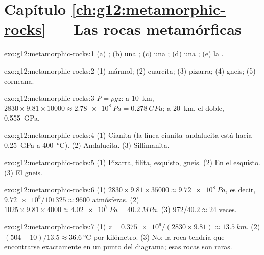 \section*{Capítulo \ref{ch:g12:metamorphic-rocks} --- Las rocas metamórficas}

\begin{solution}{exo:g12:metamorphic-rocks:1}
(a) ; (b) una ; (c) una ; (d) una ;
(e) la .
\end{solution}

\begin{solution}{exo:g12:metamorphic-rocks:2}
(1) mármol; (2) cuarcita; (3) pizarra; (4) gneis; (5) corneana.
\end{solution}

\begin{solution}{exo:g12:metamorphic-rocks:3}
$P = \rho g z$: a \qty{10}{km}, $2830 \times 9.81 \times \num{10000} \approx
\qty{2.78e8}{Pa} = \qty{0.278}{GPa}$; a \qty{20}{km}, el doble,
\qty{0.555}{GPa}.
\end{solution}

\begin{solution}{exo:g12:metamorphic-rocks:4}
(1) Cianita (la línea cianita--andalucita está hacia \qty{0.25}{GPa} a
\qty{400}{\celsius}). (2) Andalucita. (3) Sillimanita.
\end{solution}

\begin{solution}{exo:g12:metamorphic-rocks:5}
(1) Pizarra, filita, esquisto, gneis. (2) En el esquisto. (3) El gneis.
\end{solution}

\begin{solution}{exo:g12:metamorphic-rocks:6}
(1) $2830 \times 9.81 \times \num{35000} \approx \qty{9.72e8}{Pa}$, es decir,
$\num{9.72e8}/101325 \approx \num{9600}$ atmósferas. (2) $1025 \times 9.81
\times 4000 \approx \qty{4.02e7}{Pa} = \qty{40.2}{MPa}$. (3) $972/40.2
\approx 24$ veces.
\end{solution}

\begin{solution}{exo:g12:metamorphic-rocks:7}
(1) $z = \num{0.375e9}/(2830 \times 9.81) \approx \qty{13.5}{km}$.
(2) $(504 - 10)/13.5 \approx \qty{36.6}{\celsius}$ por kilómetro. (3) No:
la roca tendría que encontrarse exactamente en un punto del diagrama; esas
rocas son raras.
\end{solution}

